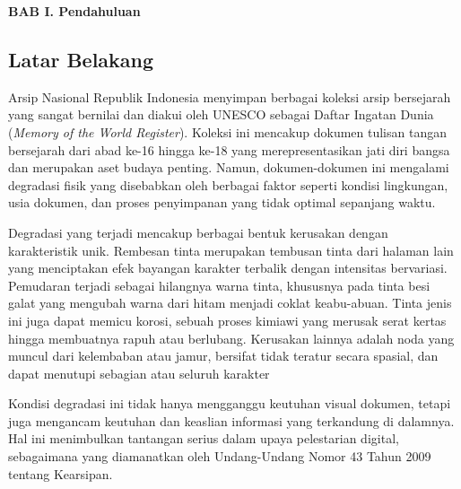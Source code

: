 \documentclass[12pt,a4paper]{article}
\begin{document}

\vspace{2cm}
\begin{center}
{\fontsize{14}{16.8}\selectfont\textbf{BAB I. Pendahuluan}}\\[1em]
\end{center}
\label{sec:pendahuluan}
\setcounter{section}{1}
\setcounter{subsection}{0}
\vspace{2em}
\subsection{Latar Belakang}
\label{subsec:latar-belakang}
\vspace{0.8em}
Arsip Nasional Republik Indonesia menyimpan berbagai koleksi arsip bersejarah yang sangat bernilai dan diakui oleh UNESCO sebagai Daftar Ingatan Dunia (\textit{Memory of the World Register}). Koleksi ini mencakup dokumen tulisan tangan bersejarah dari abad ke-16 hingga ke-18 yang merepresentasikan jati diri bangsa dan merupakan aset budaya penting. Namun, dokumen-dokumen ini mengalami degradasi fisik yang disebabkan oleh berbagai faktor seperti kondisi lingkungan, usia dokumen, dan proses penyimpanan yang tidak optimal sepanjang waktu.


\vspace{0.8em}
Degradasi yang terjadi mencakup berbagai bentuk kerusakan dengan karakteristik unik. Rembesan tinta merupakan tembusan tinta dari halaman lain yang menciptakan efek bayangan karakter terbalik dengan intensitas bervariasi. Pemudaran terjadi sebagai hilangnya warna tinta, khususnya pada tinta besi galat yang mengubah warna dari hitam menjadi coklat keabu-abuan. Tinta jenis ini juga dapat memicu korosi, sebuah proses kimiawi yang merusak serat kertas hingga membuatnya rapuh atau berlubang. Kerusakan lainnya adalah noda yang muncul dari kelembaban atau jamur, bersifat tidak teratur secara spasial, dan dapat menutupi sebagian atau seluruh karakter

\vspace{0.8em}
Kondisi degradasi ini tidak hanya mengganggu keutuhan visual dokumen, tetapi juga mengancam keutuhan dan keaslian informasi yang terkandung di dalamnya. Hal ini menimbulkan tantangan serius dalam upaya pelestarian digital, sebagaimana yang diamanatkan oleh Undang-Undang Nomor 43 Tahun 2009 tentang Kearsipan.
\end{document}

